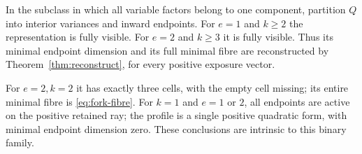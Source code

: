 \begin{theorem}\label{thm:native-visibility}
In the subclass in which all variable factors belong to one component,
partition $Q$ into interior variances and inward endpoints. For $e=1$
and $k\ge2$ the representation is fully visible. For $e=2$ and $k\ge3$
it is fully visible. Thus its minimal endpoint dimension and its full
minimal fibre are reconstructed by Theorem~\ref{thm:reconstruct}, for
every positive exposure vector.

For $e=2,k=2$ it has exactly three cells, with the empty cell missing;
its entire minimal fibre is \eqref{eq:fork-fibre}. For $k=1$ and
$e=1$ or $2$, all endpoints are active on the positive retained ray;
the profile is a single positive quadratic form, with minimal endpoint
dimension zero. These conclusions are intrinsic to this binary family.
\end{theorem}
